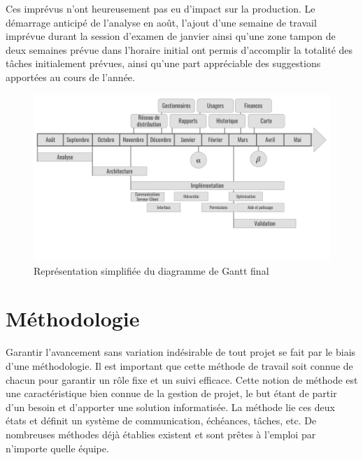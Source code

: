 \documentclass{EPL-master-thesis-covers-FR}
\begin{document}
				Ces imprévus n'ont heureusement pas eu d'impact sur la production. Le démarrage anticipé de l'analyse en août, l'ajout d'une semaine de travail imprévue durant la session d'examen de janvier ainsi qu'une zone tampon de deux semaines prévue dans l'horaire initial ont permis d'accomplir la totalité des tâches initialement prévues, ainsi qu'une part appréciable des suggestions apportées au cours de l'année.

				\begin{figure}[H]
					\includegraphics[width=\textwidth]{images/planning_timeline.png}
					\caption{Représentation simplifiée du diagramme de Gantt final}
					\label{fig:simplified_gantt}
				\end{figure}



		\section{Méthodologie}

			Garantir l'avancement sans variation indésirable de tout projet se fait par le biais d'une méthodologie. Il est important que cette méthode de travail soit connue de chacun pour garantir un rôle fixe et un suivi efficace. Cette notion de méthode est une caractéristique bien connue de la gestion de projet, le but étant de partir d'un besoin et d'apporter une solution informatisée. La méthode lie ces deux états et définit un système de communication, échéances, tâches, etc. De nombreuses méthodes déjà établies existent et sont prêtes à l'emploi par n'importe quelle équipe.
\end{document}
